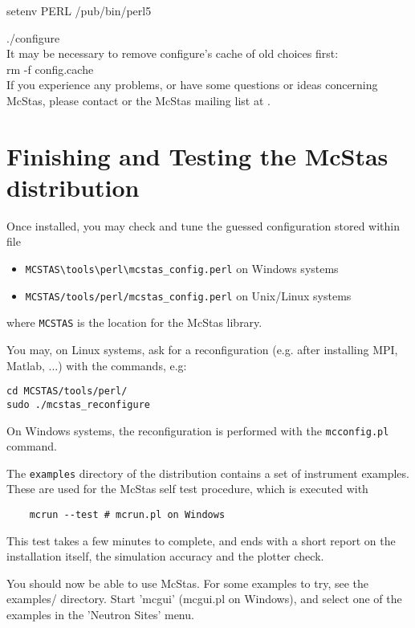     setenv PERL /pub/bin/perl5

    ./configure\\

\noindent It may be necessary to remove configure's cache of old
choices first:\\


    rm -f config.cache\\


\noindent If you experience any problems, or have some questions or ideas
concerning McStas, please contact
or the McStas mailing list at .

\section{Finishing and Testing the McStas distribution}
\label{s:testing}

Once installed, you may check and tune the guessed configuration stored within file
\begin{itemize}
\item{\verb+MCSTAS\tools\perl\mcstas_config.perl+ on Windows systems}
\item{\verb+MCSTAS/tools/perl/mcstas_config.perl+ on Unix/Linux systems}
\end{itemize}
where \verb+MCSTAS+ is the location for the McStas library.

You may, on Linux systems, ask for a reconfiguration (e.g. after installing MPI, Matlab, ...) with the commands, e.g:
\begin{verbatim}
cd MCSTAS/tools/perl/
sudo ./mcstas_reconfigure
\end{verbatim}
On Windows systems, the reconfiguration is performed with the \verb+mcconfig.pl+ command.

The \verb+examples+ directory of the distribution contains a set of instrument examples. These are used for the McStas self test procedure, which is executed with
\begin{verbatim}
    mcrun --test # mcrun.pl on Windows
\end{verbatim}
This test takes a few minutes to complete, and ends with a short report on the installation itself, the simulation accuracy and the plotter check.

You should now be able to use McStas. For some examples to try, see the
examples/ directory. Start 'mcgui' (mcgui.pl on Windows), and select one of the examples in the 'Neutron Sites' menu.
